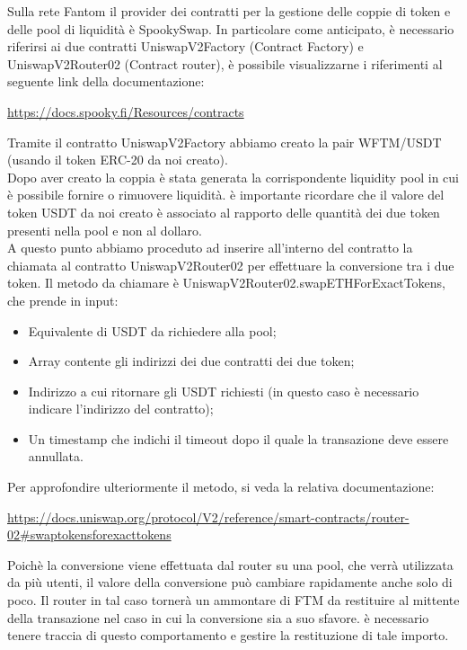Sulla rete Fantom il provider dei contratti per la gestione delle coppie di token e delle pool di liquidità è SpookySwap. In particolare come anticipato, è necessario riferirsi ai due contratti UniswapV2Factory (Contract Factory) e UniswapV2Router02 (Contract router), è possibile visualizzarne i riferimenti al seguente link della documentazione:

\begin{center}
    \href{https://docs.spooky.fi/Resources/contracts}{https://docs.spooky.fi/Resources/contracts}
\end{center}

Tramite il contratto UniswapV2Factory abbiamo creato la pair WFTM/USDT (usando il token ERC-20 da noi creato).\\ Dopo aver creato la coppia è stata generata la corrispondente liquidity pool in cui è possibile fornire o rimuovere liquidità. 
è importante ricordare che il valore del token USDT da noi creato è associato al rapporto delle quantità dei due token presenti nella pool e non al dollaro.\\

A questo punto abbiamo proceduto ad inserire all'interno del contratto la chiamata al contratto UniswapV2Router02 per effettuare la conversione tra i due token.
Il metodo da chiamare è UniswapV2Router02.swapETHForExactTokens, che prende in input:

\begin{itemize}
    \item Equivalente di USDT da richiedere alla pool;
    \item Array contente gli indirizzi dei due contratti dei due token;
    \item Indirizzo a cui ritornare gli USDT richiesti (in questo caso è necessario indicare l'indirizzo del contratto);
    \item Un timestamp che indichi il timeout dopo il quale la transazione deve essere annullata.
\end{itemize}

Per approfondire ulteriormente il metodo, si veda la relativa documentazione:

\begin{center}
    \href{https://docs.uniswap.org/protocol/V2/reference/smart-contracts/router-02\#swaptokensforexacttokens}{https://docs.uniswap.org/protocol/V2/reference/smart-contracts/router-02\#swaptokensforexacttokens}
\end{center}

Poichè la conversione viene effettuata dal router su una pool, che verrà utilizzata da più utenti, il valore della conversione può cambiare rapidamente anche solo di poco. Il router in tal caso tornerà un ammontare di FTM da restituire al mittente della transazione nel caso in cui la conversione sia a suo sfavore. è necessario tenere traccia di questo comportamento e gestire la restituzione di tale importo.

